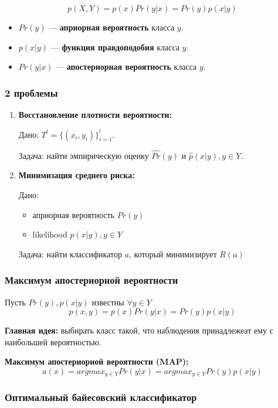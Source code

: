 \documentclass[10pt,a4paper,oneside,titlepage]{report}
\theoremstyle{defenition}
\theoremstyle{theorem}
\begin{document}
$$
p(X, Y) = p(x)Pr(y|x) = Pr(y)p(x|y)
$$

\begin{itemize}
	\item $Pr(y)$ --- {\bfseries априорная вероятность} класса $y$.
	\item $p(x|y)$ --- {\bfseries функция правдоподобия} класса $y$.
	\item $Pr(y|x)$ --- {\bfseries апостериорная вероятность} класса $y$.
\end{itemize}

\subsubsection{2 проблемы}

\begin{enumerate}
	\item {\bfseries Восстановление плотности вероятности:} 
	
	Дано: $T^l = \{(x_i, y_i)\}^l_{i=1}$.
	
	Задача: найти эмпирическую оценку $\hat{Pr}(y)$ и $\hat{p}(x|y), y \in Y$.
	\item {\bfseries Минимизация среднего риска:}
	
	Дано:
	\begin{itemize}
		\item априорная вероятность $Pr(y)$
		\item likelihood $p(x|y), y \in Y$
	\end{itemize}
    Задача: найти классификатор $a$, который минимизирует $R(a)$
\end{enumerate}

\subsubsection{Максимум апостериорной вероятности}

Пусть $Pr(y), p(x|y)$ известны $\forall y \in Y$
$$
p(x, y) = p(x)Pr(y|x) = Pr(y)p(x|y)
$$

{\bfseries Главная идея:} выбирать класс такой, что наблюдения принадлежеат ему с наибольшей вероятностью.

{\bfseries Максимум апостериорной вероятности (MAP): }
$$
a(x) = argmax_{y\in Y}Pr(y|x) = argmax_{y\in Y}Pr(y)p(x|y)
$$

\subsubsection{Оптимальный байесовский классификатор}
\end{document}

